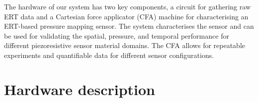The hardware of our system has two key components, a circuit for gathering raw ERT data and a Cartesian force applicator (CFA) machine for characterising an ERT-based pressure mapping sensor. The system characterises the sensor and can be used for validating the spatial, pressure, and temporal performance for different piezoresistive sensor material domains. The CFA allows for repeatable experiments and quantifiable data for different sensor configurations.

\section{Hardware description}

